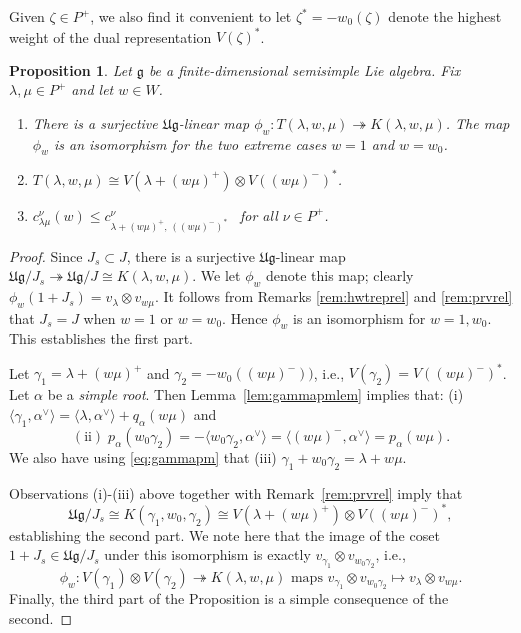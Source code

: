 \documentclass[12pt,reqno]{amsart}
\theoremstyle{plain}
\newtheorem{proposition}[theorem]{Proposition}
\theoremstyle{definition}
\theoremstyle{remark}
\theoremstyle{plain}
\newcommand{\lie}{\mathfrak}
\begin{document}
Given $\zeta \in P^+$, we also find it convenient to let $\zeta^* = -w_0(\zeta)$ denote the highest weight of the dual representation $V(\zeta)^*$.
\begin{proposition}\label{prop:tensenv}
Let $\lie g$ be a finite-dimensional semisimple Lie algebra. Fix $\lambda, \mu \in P^+$ and let $w \in W$.
    \begin{enumerate}
        \item There is a surjective $\mathfrak{Ug}$-linear map $\phi_w: T(\lambda,w,\mu) \twoheadrightarrow K(\lambda,w,\mu)$. The map $\phi_w$ is an isomorphism for the two extreme cases $w=1$ and $w=w_0$.
        \item $T(\lambda,w,\mu) \cong V(\lambda + (w\mu)^+) \otimes V((w\mu)^-)^*$.
        \item $c_{\lambda\mu}^\nu(w) \leq c_{\lambda + (w\mu)^+, \, ((w\mu)^-)^*\;}^\nu\;$ for all $\nu \in P^+$.
    \end{enumerate}
\end{proposition}
\begin{proof}
Since $J_s \subset J$, there is a surjective $\mathfrak{Ug}$-linear map $\lie{Ug}/J_s \twoheadrightarrow \lie{Ug}/J \cong K(\lambda,w,\mu)$. We let $\phi_w$ denote this map; clearly $\phi_w(1 + J_s) = v_\lambda \otimes v_{w\mu}$. It follows from Remarks \ref{rem:hwtreprel} and \ref{rem:prvrel} that $J_s = J$ when $w=1$ or $w=w_0$. Hence $\phi_w$ is an isomorphism for $w=1, w_0$. This establishes the first part.

Let $\gamma_1 = \lambda + (w\mu)^+$ and $\gamma_2 = -w_0((w\mu)^-))$, i.e., $V(\gamma_2) = V((w\mu)^-)^*$. Let $\alpha$ be a {\em simple root}. Then Lemma~\ref{lem:gammapmlem} implies that: (i) $\langle \gamma_1, \alpha^\vee \rangle = \langle \lambda, \alpha^\vee \rangle + q_\alpha(w\mu)$ and 
\begin{equation}\label{eq:partwo}
    \mathrm{(ii)}\; p_\alpha(w_0\gamma_2) = - \langle w_0\gamma_2, \alpha^\vee \rangle = \langle (w\mu)^-, \alpha^\vee \rangle = p_\alpha(w\mu).
\end{equation}
We also have using \eqref{eq:gammapm} that (iii) $\gamma_1 + w_0 \gamma_2 = \lambda + w\mu$.

Observations (i)-(iii) above together with Remark~\ref{rem:prvrel} imply that 
\[\lie{Ug}/J_s \cong K(\gamma_1, w_0, \gamma_2) \cong V(\lambda + (w\mu)^+) \otimes V((w\mu)^-)^*,\]
establishing the second part. We note here that the image of the coset $1+J_s \in \lie{Ug}/J_s$ under this isomorphism is exactly $v_{\gamma_1} \otimes v_{w_0 \gamma_2}$, i.e., 
\begin{equation}\label{eq:tensenv-canmor}
    \phi_w: V(\gamma_1) \otimes V(\gamma_2) \twoheadrightarrow K(\lambda,w,\mu)  \text{ maps }  v_{\gamma_1} \otimes v_{w_0 \gamma_2} \mapsto v_{\lambda} \otimes v_{w\mu}. 
\end{equation}
Finally, the third part of the Proposition is a simple consequence of the second.
\end{proof}
\end{document}
